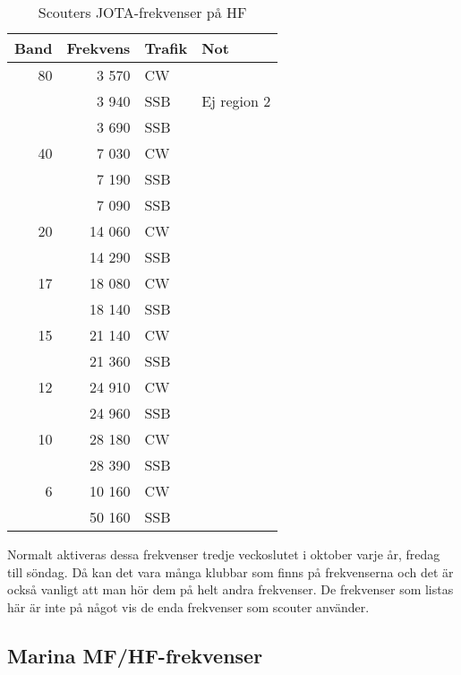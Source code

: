 \begin{table}[H]
\centering
\begin{tabular}{rrll}
	\textbf{Band} & \textbf{Frekvens} & \textbf{Trafik} & \textbf{Not} \\ \hline

               80 & 3 570  & CW  &             \\
	              & 3 940  & SSB & Ej region 2 \\
	              & 3 690  & SSB &             \\ \hline
	           40 & 7 030  & CW  &             \\
	              & 7 190  & SSB &             \\
	              & 7 090  & SSB &             \\ \hline
	           20 & 14 060 & CW  &             \\
	              & 14 290 & SSB &             \\ \hline
	           17 & 18 080 & CW  &             \\
	              & 18 140 & SSB &             \\ \hline
	           15 & 21 140 & CW  &             \\
	              & 21 360 & SSB &             \\ \hline
	           12 & 24 910 & CW  &             \\
	              & 24 960 & SSB &             \\ \hline
	           10 & 28 180 & CW  &             \\
	              & 28 390 & SSB &             \\ \hline
	            6 & 10 160 & CW  &             \\
	              & 50 160 & SSB &             \\ \hline
\end{tabular}
\caption{Scouters JOTA-frekvenser på HF}
\end{table}

Normalt aktiveras dessa frekvenser tredje veckoslutet i oktober varje
år, fredag till söndag. Då kan det vara många klubbar som finns på
frekvenserna och det är också vanligt att man hör dem på helt andra
frekvenser. De frekvenser som listas här är inte på något vis de enda
frekvenser som scouter använder.

\subsection{Marina MF/HF-frekvenser}

